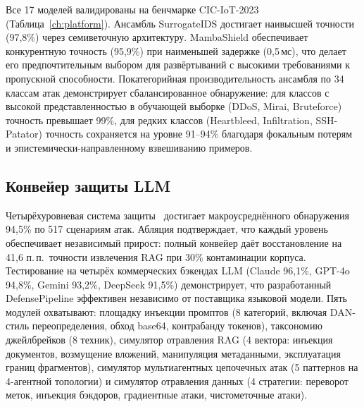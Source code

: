 Все 17 моделей валидированы на бенчмарке CIC-IoT-2023 (Таблица~\ref{ch:platform}). Ансамбль SurrogateIDS достигает наивысшей точности (97,8\%) через семиветочную архитектуру. MambaShield обеспечивает конкурентную точность (95,9\%) при наименьшей задержке (0,5\,мс), что делает его предпочтительным выбором для развёртываний с высокими требованиями к пропускной способности. Покатегорийная производительность ансамбля по 34 классам атак демонстрирует сбалансированное обнаружение: для классов с высокой представленностью в обучающей выборке (DDoS, Mirai, Bruteforce) точность превышает 99\%, для редких классов (Heartbleed, Infiltration, SSH-Patator) точность сохраняется на уровне 91--94\% благодаря фокальным потерям и эпистемически-направленному взвешиванию примеров.

\subsection{Конвейер защиты LLM}

Четырёхуровневая система защиты~\cite{Anaedevha2026neurips} достигает макроусреднённого обнаружения 94,5\% по 517 сценариям атак. Абляция подтверждает, что каждый уровень обеспечивает независимый прирост: полный конвейер даёт восстановление на 41,6 п.\,п.\ точности извлечения RAG при 30\% контаминации корпуса. Тестирование на четырёх коммерческих бэкендах LLM (Claude 96,1\%, GPT-4o 94,8\%, Gemini 93,2\%, DeepSeek 91,5\%) демонстрирует, что разработанный DefensePipeline эффективен независимо от поставщика языковой модели. Пять модулей охватывают: площадку инъекции промптов (8 категорий, включая DAN-стиль переопределения, обход base64, контрабанду токенов), таксономию джейлбрейков (8 техник), симулятор отравления RAG (4 вектора: инъекция документов, возмущение вложений, манипуляция метаданными, эксплуатация границ фрагментов), симулятор мультиагентных цепочечных атак (5 паттернов на 4-агентной топологии) и симулятор отравления данных (4 стратегии: переворот меток, инъекция бэкдоров, градиентные атаки, чистометочные атаки).

